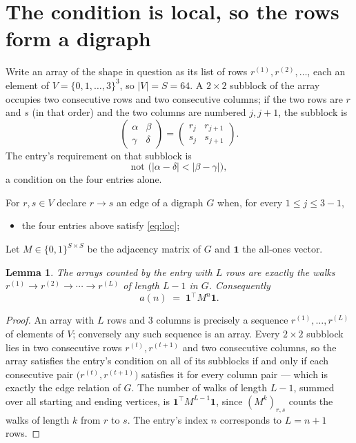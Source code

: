 \documentclass[11pt,a4paper]{article}
\theoremstyle{plain}
\newtheorem{lemma}[theorem]{Lemma}
\theoremstyle{definition}
\begin{document}
\section{The condition is local, so the rows form a digraph}

Write an array of the shape in question as its list of rows
$r^{(1)},r^{(2)},\dots$, each an element of
$V=\{0,1,\dots,3\}^{3}$, so $|V|=S=64$. A $2\times2$ subblock of the array
occupies two consecutive rows and two consecutive columns; if the two rows are $r$
and $s$ (in that order) and the two columns are numbered $j,j+1$,
the subblock is
\[
\begin{pmatrix}\alpha&\beta\\\gamma&\delta\end{pmatrix}=\begin{pmatrix}r_j&r_{j+1}\\s_j&s_{j+1}\end{pmatrix}.
\]
The entry's requirement on that subblock is
\begin{equation}\label{eq:loc}
\text{not }\bigl(|\alpha-\delta|<|\beta-\gamma|\bigr),
\end{equation}
a condition on the four entries alone.

For $r,s\in V$ declare $r\to s$ an edge of a digraph $G$ when, for every
$1\le j\le 3-1$,
\begin{itemize}
\item the four entries above satisfy \eqref{eq:loc};

\end{itemize}
Let $M\in\{0,1\}^{S\times S}$ be the adjacency matrix of $G$ and $\mathbf{1}$ the
all-ones vector.

\begin{lemma}\label{lem:walk}
The arrays counted by the entry with $L$ rows are exactly the walks
$r^{(1)}\to r^{(2)}\to\cdots\to r^{(L)}$ of length $L-1$ in $G$. Consequently
\[
a(n)\;=\;\mathbf{1}^{\!\top}M^{n}\mathbf{1} .
\]
\end{lemma}

\begin{proof}
An array with $L$ rows and $3$ columns is precisely a sequence
$r^{(1)},\dots,r^{(L)}$ of elements of $V$; conversely any such sequence is an array.
Every $2\times2$ subblock lies in two consecutive rows $r^{(t)},r^{(t+1)}$ and two
consecutive columns, so the array satisfies the entry's condition on all of its subblocks
if and only if each consecutive pair $\bigl(r^{(t)},r^{(t+1)}\bigr)$ satisfies it for
every column pair --- which is exactly the edge relation of $G$. The number of walks of
length $L-1$, summed over all starting and ending vertices, is
$\mathbf{1}^{\!\top}M^{L-1}\mathbf{1}$, since $(M^{k})_{r,s}$ counts the walks of
length $k$ from $r$ to $s$. The entry's index $n$ corresponds to $L=n+1$ rows.
\end{proof}
\end{document}
